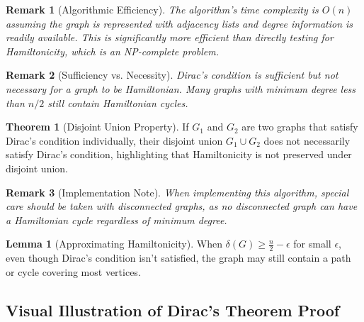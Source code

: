 \documentclass{article}
\newtheorem{remark}{Remark}
\theoremstyle{definition}
\newtheorem{theorem}{Theorem}
\newtheorem{lemma}{Lemma}
\begin{document}
\begin{remark}[Algorithmic Efficiency]
The algorithm's time complexity is $O(n)$ assuming the graph is represented with adjacency lists and degree information is readily available. This is significantly more efficient than directly testing for Hamiltonicity, which is an NP-complete problem.
\end{remark}

\begin{remark}[Sufficiency vs. Necessity]
Dirac's condition is sufficient but not necessary for a graph to be Hamiltonian. Many graphs with minimum degree less than $n/2$ still contain Hamiltonian cycles.
\end{remark}

\begin{theorem}[Disjoint Union Property]
If $G_1$ and $G_2$ are two graphs that satisfy Dirac's condition individually, their disjoint union $G_1 \cup G_2$ does not necessarily satisfy Dirac's condition, highlighting that Hamiltonicity is not preserved under disjoint union.
\end{theorem}

\begin{remark}[Implementation Note]
When implementing this algorithm, special care should be taken with disconnected graphs, as no disconnected graph can have a Hamiltonian cycle regardless of minimum degree.
\end{remark}

\begin{lemma}[Approximating Hamiltonicity]
When $\delta(G) \geq \frac{n}{2} - \epsilon$ for small $\epsilon$, even though Dirac's condition isn't satisfied, the graph may still contain a path or cycle covering most vertices.
\end{lemma}
\newpage
\subsection{Visual Illustration of Dirac's Theorem Proof}
\end{document}
